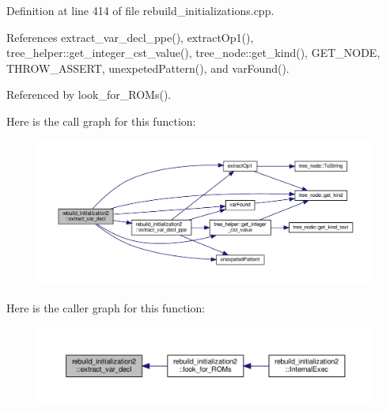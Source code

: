 Definition at line 414 of file rebuild\+\_\+initializations.\+cpp.



References extract\+\_\+var\+\_\+decl\+\_\+ppe(), extract\+Op1(), tree\+\_\+helper\+::get\+\_\+integer\+\_\+cst\+\_\+value(), tree\+\_\+node\+::get\+\_\+kind(), G\+E\+T\+\_\+\+N\+O\+DE, T\+H\+R\+O\+W\+\_\+\+A\+S\+S\+E\+RT, unexpeted\+Pattern(), and var\+Found().



Referenced by look\+\_\+for\+\_\+\+R\+O\+Ms().

Here is the call graph for this function\+:
\nopagebreak
\begin{figure}[H]
\begin{center}
\leavevmode
\includegraphics[width=350pt]{db/df3/classrebuild__initialization2_a0be02ce2244d4da31a1bc1856ed218ca_cgraph}
\end{center}
\end{figure}
Here is the caller graph for this function\+:
\nopagebreak
\begin{figure}[H]
\begin{center}
\leavevmode
\includegraphics[width=350pt]{db/df3/classrebuild__initialization2_a0be02ce2244d4da31a1bc1856ed218ca_icgraph}
\end{center}
\end{figure}
\mbox{\label{classrebuild__initialization2_ae04cac56986ff94ce40cb7e9279e0628}} 

